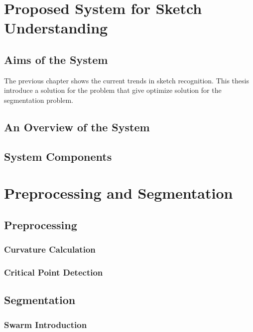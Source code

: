 \chapter{Proposed System for Sketch Understanding}
\section{Aims of the System}
\label{sec:AimsOfTheSystem}
The previous chapter shows the current trends in sketch recognition. This thesis introduce a solution for the problem that give optimize solution for the segmentation problem. 

\section{An Overview of the System}
\label{sec:AnOverviewOfTheSystem}
 
 
 
\section{System Components}
\label{sec:SystemComponents}



\chapter{Preprocessing and Segmentation}
\label{sec:Preprocessingandsegmentation}


\section{Preprocessing}
\label{sec:Preprocessing}

\subsection{Curvature Calculation}
\label{sec:CurvatureCalculation}

\subsection{Critical Point Detection}
\label{sec:CriticalPointDetection}


\section{Segmentation}
\label{sec:Segmentation}
\subsection{Swarm Introduction}
\label{sec:SwarmIntroduction}


